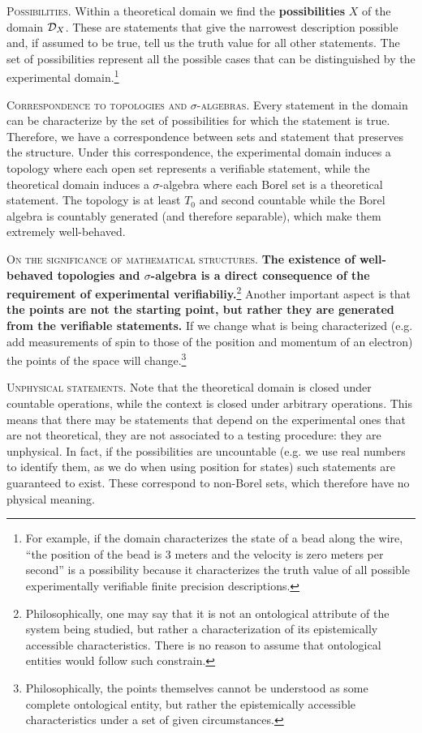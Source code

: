 \documentclass[10pt,twocolumn, nofootinbib]{revtex4-1}
\newcommand\partitle[1]{\textsc{#1}.}
\begin{document}
\partitle{Possibilities} Within a theoretical domain we find the \textbf{possibilities} $X$ of the domain $\mathcal{D}_X$. These are statements that give the narrowest description possible and, if assumed to be true, tell us the truth value for all other statements. The set of possibilities represent all the possible cases that can be distinguished by the experimental domain.\footnote{For example, if the domain characterizes the state of a bead along the wire, ``the position of the bead is 3 meters and the velocity is zero meters per second'' is a possibility because it characterizes the truth value of all possible experimentally verifiable finite precision descriptions.}

\partitle{Correspondence to topologies and $\sigma$-algebras} Every statement in the domain can be characterize by the set of possibilities for which the statement is true. Therefore, we have a correspondence between sets and statement that preserves the structure. Under this correspondence, the experimental domain induces a topology where each open set represents a verifiable statement, while the theoretical domain induces a $\sigma$-algebra where each Borel set is a theoretical statement. The topology is at least $T_0$ and second countable while the Borel algebra is countably generated (and therefore separable), which make them extremely well-behaved.

\partitle{On the significance of mathematical structures} \textbf{The existence of well-behaved topologies and $\sigma$-algebra is a direct consequence of the requirement of experimental verifiabiliy.}\footnote{Philosophically, one may say that it is not an ontological attribute of the system being studied, but rather a characterization of its epistemically accessible characteristics. There is no reason to assume that ontological entities would follow such constrain.} Another important aspect is that \textbf{the points are not the starting point, but rather they are generated from the verifiable statements.} If we change what is being characterized (e.g. add measurements of spin to those of the position and momentum of an electron) the points of the space will change.\footnote{Philosophically, the points themselves cannot be understood as some complete ontological entity, but rather the epistemically accessible characteristics under a set of given circumstances.}

\partitle{Unphysical statements} Note that the theoretical domain is closed under countable operations, while the context is closed under arbitrary operations. This means that there may be statements that depend on the experimental ones that are not theoretical, they are not associated to a testing procedure: they are unphysical. In fact, if the possibilities are uncountable (e.g. we use real numbers to identify them, as we do when using position for states) such statements are guaranteed to exist. These correspond to non-Borel sets, which therefore have no physical meaning.
\end{document}
